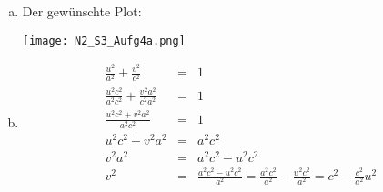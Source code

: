 \documentclass[11pt]{article} %
\begin{document}
\begin{enumerate}[a)]

\item Der gewünschte Plot:

\texttt{[image: N2\_S3\_Aufg4a.png]}

\item
\begin{eqnarray*}
\frac{u^2}{a^2} + \frac{v^2}{c^2} &=& 1 \\
\frac{u^2c^2}{a^2c^2} + \frac{v^2a^2}{c^2a^2} &=& 1 \\
\frac{u^2c^2 + v^2a^2}{a^2c^2} &=& 1 \\
u^2c^2 + v^2a^2 &=& a^2c^2 \\
v^2a^2 &=& a^2c^2 - u^2c^2 \\
v^2 &=& \frac{a^2c^2 - u^2c^2}{a^2} = \frac{a^2c^2}{a^2} - \frac{u^2c^2}{a^2} = c^2 - \frac{c^2}{a^2}u^2
\end{eqnarray*}


\end{enumerate}
\end{document}
